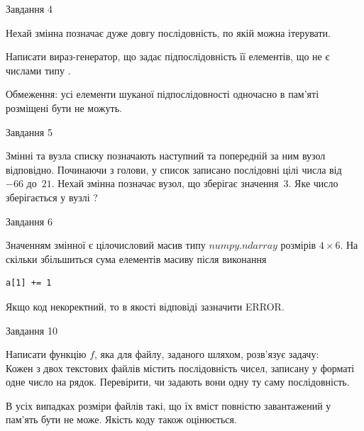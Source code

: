 \documentclass[12pt, ukrainian]{article}
\begin{document}
{               
{\begin{center}Завдання {4}\end{center}}
\vspace{-6mm}
Нехай змінна  позначає дуже довгу послідовність, по якій можна ітерувати.

Написати вираз-генератор, що задає підпослідовність її елементів, що не є числами типу .

Обмеження: усі елементи шуканої підпослідовності одночасно в пам'яті розміщені бути не можуть.\par

\vspace{10mm}
               
{\begin{center}Завдання {5}\end{center}}
\vspace{-6mm}
Змінні  та  вузла списку позначають наступний та попередній за ним вузол відповідно. Починаючи з голови, у список записано послідовні цілі числа від~$-66$ до~$21$. Нехай змінна  позначає вузол, що зберігає значення~$3$.
Яке число зберігається у вузлі  ?\par

               
{\begin{center}Завдання {6}\end{center}}
\vspace{-6mm}
Значенням змінної  є цілочисловий масив типу $numpy.ndarray$ розмірів $4{\times}6$. На скільки збільшиться сума елементів масиву  після виконання
\begin{verbatim}
a[1] += 1
\end{verbatim}


Якщо код некоректний, то в якості відповіді зазначити ERROR.\par

               
{\begin{center}Завдання {10}\end{center}}
\vspace{-6mm}

Написати функцію $f$, яка для файлу, заданого шляхом, розв’язує задачу:\\ Кожен з двох текстових файлів містить послідовність чисел, записану у форматі одне число на рядок.  Перевірити, чи задають вони одну ту саму послідовність.

В усіх випадках розміри файлів такі, що їх вміст повністю завантажений у пам'ять бути не може. Якість коду також оцінюється.



}
\end{document}
